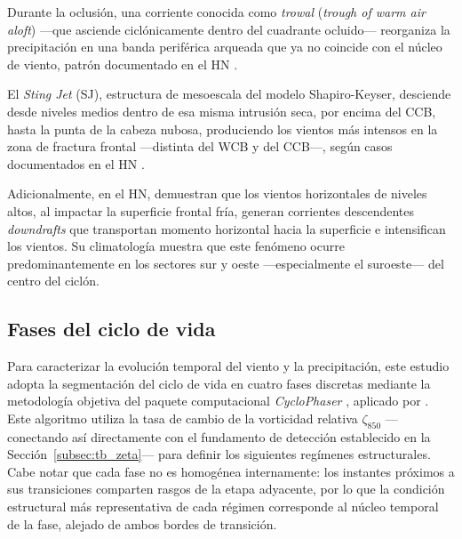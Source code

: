 Durante la oclusión, una corriente conocida como \textit{trowal} (\textit{trough of warm air aloft}) —que asciende ciclónicamente dentro del cuadrante ocluido— reorganiza la precipitación en una banda periférica arqueada que ya no coincide con el núcleo de viento, patrón documentado en el HN \citep{martin1999forcing, naud2025lifecycle}.

El \textit{Sting Jet} (SJ), estructura de mesoescala del modelo Shapiro-Keyser, desciende desde niveles medios dentro de esa misma intrusión seca, por encima del CCB, hasta la punta de la cabeza nubosa, produciendo los vientos más intensos en la zona de fractura frontal —distinta del WCB y del CCB—, según casos documentados en el HN \citep{clark2005sting, clark2018sting, martinez2014cold}.

Adicionalmente, en el HN, \citet{hyeok2024extrem} demuestran que los vientos horizontales de niveles altos, al impactar la superficie frontal fría, generan corrientes descendentes \textit{downdrafts} que transportan momento horizontal hacia la superficie e intensifican los vientos. Su climatología muestra que este fenómeno ocurre predominantemente en los sectores sur y oeste —especialmente el suroeste— del centro del ciclón.

\subsection{Fases del ciclo de vida}\label{subsec:tb_fases}

Para caracterizar la evolución temporal del viento y la precipitación, este estudio adopta la segmentación del ciclo de vida en cuatro fases discretas mediante la metodología objetiva del paquete computacional \textit{CycloPhaser} \citep{deSouza2025CycloPhaser}, aplicado por \citet{coutodesouza2024new}. Este algoritmo utiliza la tasa de cambio de la vorticidad relativa $\zeta_{850}$ —conectando así directamente con el fundamento de detección establecido en la Sección~\ref{subsec:tb_zeta}— para definir los siguientes regímenes estructurales. Cabe notar que cada fase no es homogénea internamente: los instantes próximos a sus transiciones comparten rasgos de la etapa adyacente, por lo que la condición estructural más representativa de cada régimen corresponde al núcleo temporal de la fase, alejado de ambos bordes de transición.

